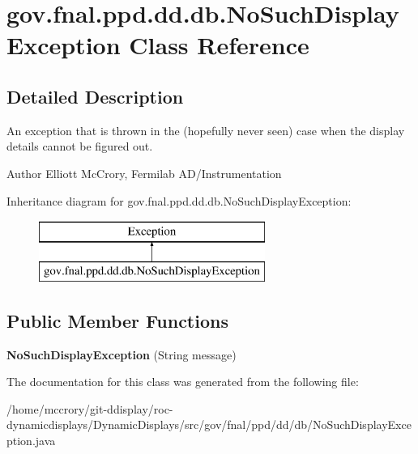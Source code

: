 \hypertarget{classgov_1_1fnal_1_1ppd_1_1dd_1_1db_1_1NoSuchDisplayException}{\section{gov.\-fnal.\-ppd.\-dd.\-db.\-No\-Such\-Display\-Exception Class Reference}
\label{classgov_1_1fnal_1_1ppd_1_1dd_1_1db_1_1NoSuchDisplayException}
}


\subsection{Detailed Description}
An exception that is thrown in the (hopefully never seen) case when the display details cannot be figured out.

\begin{DoxyAuthor}{Author}
Elliott Mc\-Crory, Fermilab A\-D/\-Instrumentation 
\end{DoxyAuthor}
Inheritance diagram for gov.\-fnal.\-ppd.\-dd.\-db.\-No\-Such\-Display\-Exception\-:\begin{figure}[H]
\begin{center}
\leavevmode
\includegraphics[height=2.000000cm]{classgov_1_1fnal_1_1ppd_1_1dd_1_1db_1_1NoSuchDisplayException}
\end{center}
\end{figure}
\subsection*{Public Member Functions}
\begin{DoxyCompactItemize}
\item 
\hypertarget{classgov_1_1fnal_1_1ppd_1_1dd_1_1db_1_1NoSuchDisplayException_a146774399d8da17cc34caed0f073d072}{{\bfseries No\-Such\-Display\-Exception} (String message)}\label{classgov_1_1fnal_1_1ppd_1_1dd_1_1db_1_1NoSuchDisplayException_a146774399d8da17cc34caed0f073d072}

\end{DoxyCompactItemize}


The documentation for this class was generated from the following file\-:\begin{DoxyCompactItemize}
\item 
/home/mccrory/git-\/ddisplay/roc-\/dynamicdisplays/\-Dynamic\-Displays/src/gov/fnal/ppd/dd/db/No\-Such\-Display\-Exception.\-java\end{DoxyCompactItemize}
